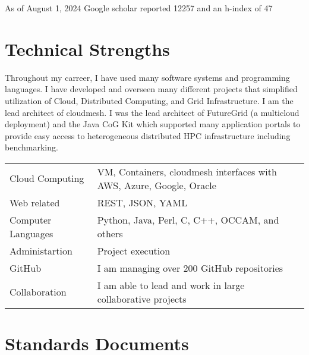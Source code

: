 \documentclass{article}
\begin{document}
As of August 1, 2024 Google scholar reported 12257 and an h-index of 47



\section{Technical Strengths}

Throughout my carreer, I have used many software systems and
programming languages.  I have developed and overseen many different
projects that simplified utilization of Cloud, Distributed Computing,
and Grid Infrastructure. I am the lead architect of cloudmesh. I was
the lead architect of FutureGrid (a multicloud deployment) and the
Java CoG Kit which supported many application portals to provide easy
access to heterogeneous distributed HPC infrastructure including benchmarking.

\bigskip

\begin{tabular}{ll}
Cloud Computing & VM, Containers, cloudmesh interfaces with AWS, Azure, Google, Oracle\\
Web related & REST, JSON, YAML \\
Computer Languages & Python, Java, Perl, C, C++, OCCAM, and others\\
Administartion & Project execution\\
GitHub         & I am managing over 200 GitHub repositories\\
Collaboration & I am able to lead and work in large collaborative projects\\
\end{tabular}


\section{Standards Documents}

\begin{refsegment}

  \nocite{las-2020-nist-bigdata}
  \nocite{las-2019-nist}  
  \nocite{las-2019-nist-vol8}
  \nocite{las-2001-gosv3}
  \nocite{las-2001-gosv2}  

\end{refsegment}
\end{document}
